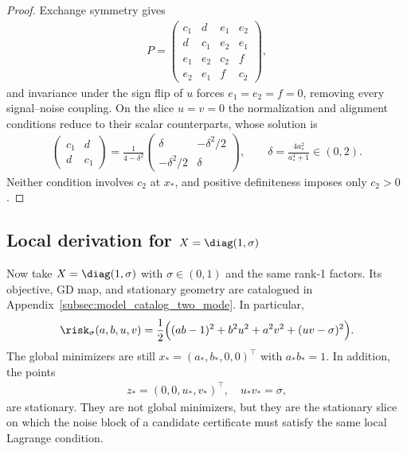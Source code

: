 \documentclass{article}
\begin{document}
\begin{proof}
Exchange symmetry gives
\begin{align}
    P=
    \begin{pmatrix}
        c_1 & d   & e_1 & e_2\\
        d   & c_1 & e_2 & e_1\\
        e_1 & e_2 & c_2 & f\\
        e_2 & e_1 & f   & c_2
    \end{pmatrix},
\end{align}
and invariance under the sign flip of $u$ forces $e_1=e_2=f=0$, removing every
signal--noise coupling. On the slice $u=v=0$ the normalization and alignment
conditions reduce to their scalar counterparts, whose solution is
\begin{align}
    \begin{pmatrix}
        c_1 & d\\
        d & c_1
    \end{pmatrix}
    =
    \frac{1}{4-\delta^2}
    \begin{pmatrix}
        \delta & -\delta^2/2\\
        -\delta^2/2 & \delta
    \end{pmatrix},
    \qquad
    \delta=\frac{4a_*^2}{a_*^4+1}\in(0,2).
\end{align}
Neither condition involves $c_2$ at $x_*$, and positive definiteness imposes
only $c_2>0$.
\end{proof}

\subsection{Local derivation for \texorpdfstring{$X=\diag(1,\sigma)$}{X=diag(1,sigma)}}
\label{appendix:diag1sigma_state_dependent_structure}

Now take $X=\diag(1,\sigma)$ with $\sigma\in(0,1)$ and the same rank-1
factors. Its objective, GD map, and stationary geometry are catalogued in
Appendix~\ref{subsec:model_catalog_two_mode}. In particular,
\begin{align}
    \risk_\sigma(a,b,u,v)
    =
    \frac12\Bigl((ab-1)^2+b^2u^2+a^2v^2+(uv-\sigma)^2\Bigr).
\end{align}
The global minimizers are still $x_*=(a_*,b_*,0,0)^\top$ with $a_*b_*=1$. In
addition, the points
\begin{align}
    z_*=(0,0,u_*,v_*)^\top,\quad u_*v_*=\sigma,
\end{align}
are stationary. They are not global minimizers, but they are the stationary
slice on which the noise block of a candidate certificate must satisfy the
same local Lagrange condition.
\end{document}
